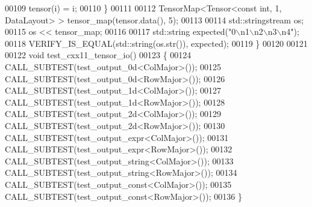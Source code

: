 \begin{DoxyCode}
00109     tensor(i) = i;
00110   \}
00111 
00112   TensorMap<Tensor<const int, 1, DataLayout> > tensor\_map(tensor.data(), 5);
00113 
00114   std::stringstream os;
00115   os << tensor\_map;
00116 
00117   std::string expected(\textcolor{stringliteral}{"0\(\backslash\)n1\(\backslash\)n2\(\backslash\)n3\(\backslash\)n4"});
00118   VERIFY\_IS\_EQUAL(std::string(os.str()), expected);
00119 \}
00120 
00121 
00122 \textcolor{keywordtype}{void} test\_cxx11\_tensor\_io()
00123 \{
00124   CALL\_SUBTEST(test\_output\_0d<ColMajor>());
00125   CALL\_SUBTEST(test\_output\_0d<RowMajor>());
00126   CALL\_SUBTEST(test\_output\_1d<ColMajor>());
00127   CALL\_SUBTEST(test\_output\_1d<RowMajor>());
00128   CALL\_SUBTEST(test\_output\_2d<ColMajor>());
00129   CALL\_SUBTEST(test\_output\_2d<RowMajor>());
00130   CALL\_SUBTEST(test\_output\_expr<ColMajor>());
00131   CALL\_SUBTEST(test\_output\_expr<RowMajor>());
00132   CALL\_SUBTEST(test\_output\_string<ColMajor>());
00133   CALL\_SUBTEST(test\_output\_string<RowMajor>());
00134   CALL\_SUBTEST(test\_output\_const<ColMajor>());
00135   CALL\_SUBTEST(test\_output\_const<RowMajor>());
00136 \}
\end{DoxyCode}
